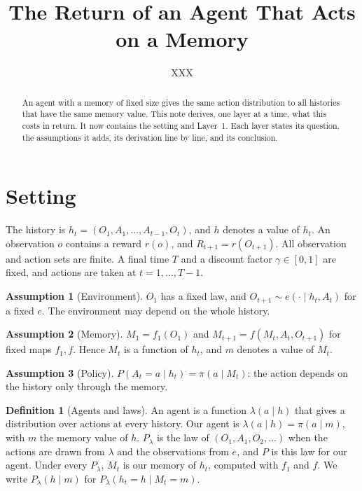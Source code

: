\documentclass{article}
\title{The Return of an Agent That Acts on a Memory}
\author{XXX}
\theoremstyle{definition}
\newtheorem{definition}[proposition]{Definition}
\newtheorem{assumption}{Assumption}
\numberwithin{equation}{section}
\begin{document}
\maketitle

\begin{abstract}
An agent with a memory of fixed size gives the same action distribution to all histories that have the same memory value. This note derives, one layer at a time, what this costs in return. It now contains the setting and Layer~1. Each layer states its question, the assumptions it adds, its derivation line by line, and its conclusion.
\end{abstract}

\section{Setting}\label{sec:setting}

The history is $h_t=(O_1,A_1,\dots,A_{t-1},O_t)$, and $h$ denotes a value of $h_t$. An observation $o$ contains a reward $r(o)$, and $R_{t+1}=r(O_{t+1})$. All observation and action sets are finite. A final time $T$ and a discount factor $\gamma\in[0,1]$ are fixed, and actions are taken at $t=1,\dots,T-1$.

\begin{assumption}[Environment]\label{as:env}
$O_1$ has a fixed law, and $O_{t+1}\sim e(\cdot\mid h_t,A_t)$ for a fixed $e$. The environment may depend on the whole history.
\end{assumption}

\begin{assumption}[Memory]\label{as:mem}
$M_1=f_1(O_1)$ and $M_{t+1}=f(M_t,A_t,O_{t+1})$ for fixed maps $f_1,f$. Hence $M_t$ is a function of $h_t$, and $m$ denotes a value of $M_t$.
\end{assumption}

\begin{assumption}[Policy]\label{as:pol}
$P(A_t=a\mid h_t)=\pi(a\mid M_t)$: the action depends on the history only through the memory.
\end{assumption}

\begin{definition}[Agents and laws]\label{def:agent}
An agent is a function $\lambda(a\mid h)$ that gives a distribution over actions at every history. Our agent is $\lambda(a\mid h)=\pi(a\mid m)$, with $m$ the memory value of $h$. $P_\lambda$ is the law of $(O_1,A_1,O_2,\dots)$ when the actions are drawn from $\lambda$ and the observations from $e$, and $P$ is this law for our agent. Under every $P_\lambda$, $M_t$ is our memory of $h_t$, computed with $f_1$ and $f$. We write $P_\lambda(h\mid m)$ for $P_\lambda(h_t=h\mid M_t=m)$.
\end{definition}
\end{document}
